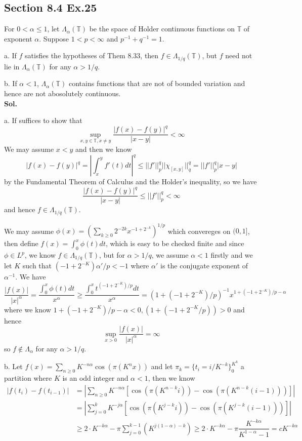 \documentclass[lang=en,11pt,a4paper,citestyle =authoryear]{elegantpaper}
\begin{document}
\subsection*{Section 8.4 Ex.25} 
For $0<\alpha\leq 1$, let $\Lambda_{\alpha}(\mathbb{T})$ be the space of Holder continuous functions on $\mathbb{T}$ of exponent $\alpha$. Suppose $1<p<\infty$ and $p^{-1}+q^{-1} = 1$.\par
a. If $f$ satisfies the hypotheses of Them 8.33, then $f\in \Lambda_{1/q}(\mathbb{T})$, but $f$ need not lie in $\Lambda_{\alpha}(\mathbb{T})$ for any $\alpha > 1/q$.\par
b. If $\alpha < 1$, $\Lambda_{\alpha}(\mathbb{T})$ contains functions that are not of bounded variation and hence are not abosolutely continuous.
\vspace{0.5em}\\
\textbf{Sol.} \par
a. If suffices to show that
\[\sup_{x,y\in\mathbb{T},x\neq y}\dfrac{|f(x)-f(y)|^q}{|x-y|} < \infty\]
We may assume $x<y$ and then we know
\[
|f(x)-f(y)|^q = |\int_x^y f'(t)dt|^q \leq ||f'||_p^q||\chi_{[x,y]}||_q^q = ||f'||_p^q|x-y|
\]
by the Fundamental Theorem of Calculus and the Holder's inequality, so we have
\[
\dfrac{|f(x)-f(y)|^q}{|x-y|} \leq ||f'||_p^q < \infty
\]
and hence $f\in \Lambda_{1/q}(\mathbb{T})$.\par
We may assume $\phi(x) = (\sum\limits_{k\geq 0}2^{-2k}x^{-1+2^{-k}})^{1/p}$ which convereges on $(0,1]$, then define $f(x) = \int_0^x \phi(t)dt$, which is easy to be checked finite and since $\phi\in L^p$, we know $f\in\Lambda_{1/q}(\mathbb{T})$, but for $\alpha > 1/q$, we assume $\alpha < 1$ firstly and we let $K$ such that $(-1+2^{-K})\alpha'/p < -1$ where $\alpha'$ is the conjugate exponent of $\alpha^{-1}$. We have
\[
\dfrac{|f(x)|}{|x|^{\alpha}} = \dfrac{\int_0^x \phi(t)dt}{x^{\alpha}} \geq \dfrac{\int_0^x t^{(-1+2^{-K})/p} dt}{x^{\alpha}} = (1+(-1+2^{-K})/p)^{-1}x^{1+(-1+2^{-K})/p-\alpha}
\]
where we know $1+(-1+2^{-K})/p - \alpha < 0, (1+(-1+2^{-K}/p))>0$ and hence
\[
\sup_{x>0}\dfrac{|f(x)|}{|x|^{\alpha}} = \infty
\]
so $f\notin \Lambda_{\alpha}$ for any $\alpha > 1/q$.\par
b. Let $f(x) = \sum_{n\geq 0}K^{-n\alpha}\cos(\pi (K^n x))$ and let $\pi_k = \{t_i = i/K^{-k}\}_0^{K^k}$ a partition where $K$ is an odd integer and $\alpha < 1$, then we know
\[
\begin{aligned}
|f(t_i)-f(t_{i-1})| &= |\sum_{n\geq 0} K^{-n\alpha}[\cos(\pi (K^{n-k}i))-\cos(\pi(K^{n-k}(i-1)))]| \\
&= |\sum_{j=0}^k K^{-j\alpha}[\cos(\pi(K^{j-k}i))-\cos(\pi(K^{j-k}(i-1)))]|\\
&\geq 2\cdot K^{-k\alpha} - \pi\sum\limits_{j=0}^{k-1}(K^{j(1-\alpha)-k})
\geq 2\cdot K^{-k\alpha}-\pi\dfrac{K^{-k\alpha }}{K^{1-\alpha}-1} = cK^{-k\alpha} 
\end{aligned}
\]
\end{document}
